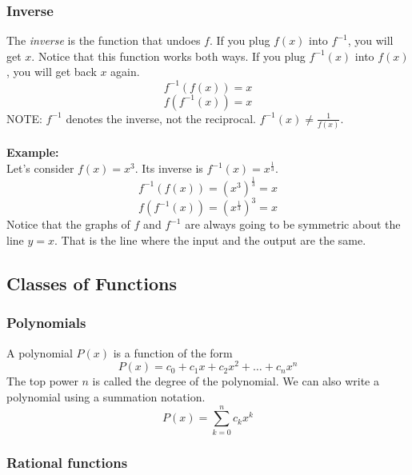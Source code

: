 \documentclass[twoside,openright,titlepage,a4paper]{book}
\begin{document}
\begin{sloppypar}
\subsubsection{Inverse}
The \textit{inverse} is the function that undoes $f$. If you plug ${f(x)}$ into ${f^{-1}}$, you will get $x$. Notice that this function works both ways. If you plug ${f^{-1}(x)}$ into $f(x)$, you will get back $x$ again.
\begin{equation*} f^{-1}(f(x))=x \end{equation*} 
\begin{equation*} f(f^{-1}(x))=x \end{equation*}
NOTE: ${f^{-1}}$ denotes the inverse, not the reciprocal. ${f^{-1}(x)\neq\frac{1}{f(x)}}$.\\\\
\textbf{Example:}\\
Let's consider ${f(x)=x^{3}}$. Its inverse is ${f^{-1}(x)=x^{\frac{1}{3}}}$.
\begin{equation*} f^{-1}(f(x))=(x^{3})^{\frac{1}{3}}=x \end{equation*}
\begin{equation*} f(f^{-1}(x))=(x^{\frac{1}{3}})^{3}=x \end{equation*}
Notice that the graphs of $f$ and $f^{-1}$ are always going to be symmetric about the line ${y=x}$. That is the line where the input and the output are the same.

\subsection{Classes of Functions} \label{ChFunctionsSubsClassesOfFunctions}
 
\subsubsection{Polynomials}

A polynomial $P(x)$ is a function of the form 
\begin{equation*} P(x)=c_{0}+c_{1}x+c_{2}x^{2}+\dots+c_{n}x^{n} \end{equation*}
The top power $n$ is called the degree of the polynomial. We can also write a polynomial using a summation notation.
\begin{equation*} P(x)=\sum_{k=0}^{n}c_{k}x^{k} \end{equation*}

\subsubsection{Rational functions}


\end{sloppypar}
\end{document}
